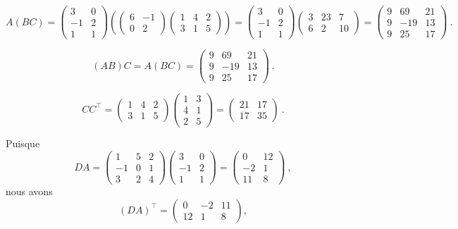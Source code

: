 {
\[
A(BC) = \begin{pmatrix} 3 & 0 \\ -1 & 2 \\ 1 & 1 \end{pmatrix}
\left( \begin{pmatrix} 6 & -1 \\ 0 & 2 \end{pmatrix}
  \begin{pmatrix} 1 & 4 & 2 \\ 3 & 1 & 5 \end{pmatrix} \right)
= \begin{pmatrix} 3 & 0 \\ -1 & 2 \\ 1 & 1 \end{pmatrix}
\begin{pmatrix} 3 & 23 & 7 \\ 6 & 2 & 10 \end{pmatrix}
= \begin{pmatrix}
9 & 69 & 21 \\
9 & -19 & 13 \\
9 & 25 & 17
\end{pmatrix} \ .
\]

\[
(AB)C = A(BC)
= \begin{pmatrix} 9 & 69 & 21 \\ 9 & -19 & 13 \\ 9 & 25 & 17 \end{pmatrix} \ .
\]

\[
CC^\top = \begin{pmatrix} 1 & 4 & 2 \\ 3 & 1 & 5 \end{pmatrix}
\begin{pmatrix} 1 & 3 \\ 4 & 1 \\ 2 & 5 \end{pmatrix}
= \begin{pmatrix} 21 & 17 \\ 17 & 35 \end{pmatrix} \ .
\]

 Puisque
\[
DA = \begin{pmatrix} 1 & 5 & 2 \\ -1 & 0 & 1 \\ 3 & 2 & 4 \end{pmatrix}
\begin{pmatrix} 3 & 0 \\ -1 & 2 \\ 1 & 1 \end{pmatrix}
= \begin{pmatrix} 0 & 12 \\ -2 & 1 \\ 11 & 8 \end{pmatrix} \ ,
\]
nous avons
\[
(DA)^\top = \begin{pmatrix} 0 & -2 & 11 \\ 12 & 1 & 8 \end{pmatrix} ,
\]

}
